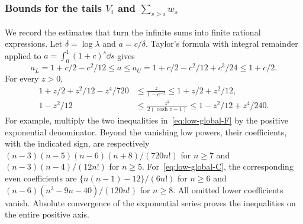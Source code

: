 \subsubsection{\texorpdfstring{Bounds for the tails $V_i$ and $\sum_{s>i}w_s$}{Bounds for V(i) and the tail sum of w(s)}}
We record the estimates that turn the infinite sums into finite rational
expressions.  Let $\delta=\log\lambda$ and $a=c/\delta$.  Taylor's
formula with integral remainder applied to
$a=\int_0^1(1+c)^s\dd s$ gives
\begin{equation}\label{eq:low-log-enclosure}
 a_L=1+c/2-c^2/12\le a\le
 a_U=1+c/2-c^2/12+c^3/24\le1+c/2.
\end{equation}
For every $z>0$,
\begin{align}
 1+z/2+z^2/12-z^4/720
 &\le\frac{z}{1-e^{-z}}\le1+z/2+z^2/12,\label{eq:low-global-F}\\
 1-z^2/12&\le\frac{z^2}{2(\cosh z-1)}
                       \le1-z^2/12+z^4/240.\label{eq:low-global-C}
\end{align}
For example, multiply the two inequalities in~\eqref{eq:low-global-F}
by the positive exponential denominator.  Beyond the vanishing low
powers, their coefficients, with the indicated sign, are respectively
$(n-3)(n-5)(n-6)(n+8)/(720n!)$ for $n\ge7$ and
$(n-3)(n-4)/(12n!)$ for $n\ge5$.  For~\eqref{eq:low-global-C},
the corresponding even coefficients are
$\{n(n-1)-12\}/(6n!)$ for $n\ge6$ and
$(n-6)(n^3-9n-40)/(120n!)$ for $n\ge8$.
All omitted lower coefficients vanish.  Absolute convergence of the
exponential series proves the inequalities on the entire positive axis.

